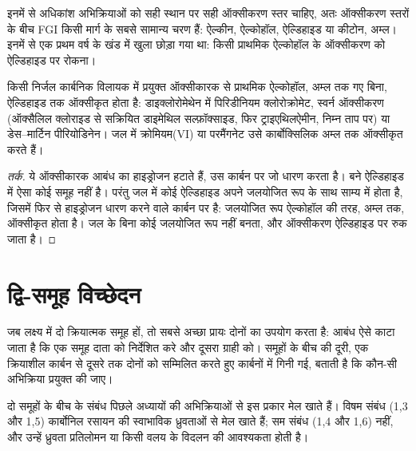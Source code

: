 इनमें से अधिकांश अभिक्रियाओं को सही स्थान पर सही ऑक्सीकरण स्तर चाहिए, अतः ऑक्सीकरण
स्तरों के बीच FGI किसी मार्ग के सबसे सामान्य चरण हैं: ऐल्कीन, ऐल्कोहॉल, ऐल्डिहाइड या कीटोन, अम्ल। इनमें से एक
प्रथम वर्ष के खंड में खुला छोड़ा गया था: किसी प्राथमिक ऐल्कोहॉल के ऑक्सीकरण को ऐल्डिहाइड पर रोकना।

\begin{proposition}[मृदु ऑक्सीकरण]\label{prop:b2:retrosynthesis:mild-oxidation}
किसी निर्जल कार्बनिक विलायक में प्रयुक्त ऑक्सीकारक से प्राथमिक ऐल्कोहॉल, अम्ल तक गए बिना,
ऐल्डिहाइड तक ऑक्सीकृत होता है: डाइक्लोरोमेथेन में पिरिडीनियम क्लोरोक्रोमेट, स्वर्न ऑक्सीकरण (ऑक्सैलिल क्लोराइड से
सक्रियित डाइमेथिल सल्फ़ॉक्साइड, फिर ट्राइएथिलऐमीन, निम्न ताप पर) या डेस--मार्टिन
पीरियोडिनेन। जल में क्रोमियम(VI) या परमैंगनेट उसे कार्बोक्सिलिक अम्ल तक ऑक्सीकृत करते हैं।
\end{proposition}

\begin{proof}[तर्क]
ये ऑक्सीकारक  आबंध का हाइड्रोजन हटाते हैं, उस कार्बन पर जो  धारण करता है। बने ऐल्डिहाइड
में ऐसा कोई समूह नहीं है। परंतु जल में कोई ऐल्डिहाइड अपने जलयोजित रूप
 के साथ साम्य में होता है, जिसमें फिर से हाइड्रोजन धारण करने वाले कार्बन पर  है: जलयोजित रूप
ऐल्कोहॉल की तरह, अम्ल तक, ऑक्सीकृत होता है। जल के बिना कोई जलयोजित रूप नहीं बनता, और ऑक्सीकरण
ऐल्डिहाइड पर रुक जाता है।
\end{proof}

\section{द्वि-समूह विच्छेदन}

जब लक्ष्य में दो क्रियात्मक समूह हों, तो सबसे अच्छा  प्रायः दोनों का उपयोग करता है: आबंध ऐसे काटा जाता है
कि एक समूह दाता को निर्देशित करे और दूसरा ग्राही को। समूहों के बीच की दूरी,
एक क्रियाशील कार्बन से दूसरे तक दोनों को सम्मिलित करते हुए कार्बनों में गिनी गई, बताती है कि कौन-सी अभिक्रिया प्रयुक्त की जाए।

\begin{proposition}[पैटर्न और उनकी अभिक्रियाएँ]\label{prop:b2:retrosynthesis:patterns}
दो समूहों के बीच के संबंध पिछले अध्यायों की अभिक्रियाओं से इस प्रकार मेल खाते हैं।
विषम संबंध (1,3 और 1,5) कार्बोनिल रसायन की स्वाभाविक ध्रुवताओं से मेल खाते हैं; सम संबंध (1,4
और 1,6) नहीं, और उन्हें ध्रुवता प्रतिलोमन या किसी वलय के विदलन की आवश्यकता होती है।
\end{proposition}


